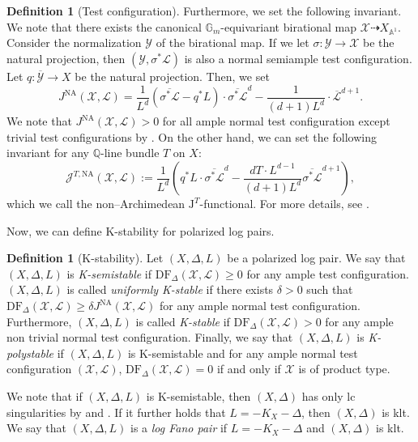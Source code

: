 \documentclass[12pt,twoside]{amsart}
\theoremstyle{definition}
\newtheorem{defn}[thm]{Definition}
\begin{document}
\begin{defn}[Test configuration]
    Furthermore, we set the following invariant.
    We note that there exists the canonical $\mathbb{G}_m$-equivariant birational map $\mathcal{X}\dashrightarrow X_{\mathbb{A}^1}$.
    Consider the normalization $\mathcal{Y}$ of the birational map.
    If we let $\sigma\colon \mathcal{Y}\to\mathcal{X}$ be the natural projection, then $(\mathcal{Y},\sigma^*\mathcal{L})$ is also a normal semiample test configuration.
    Let $q\colon \overline{\mathcal{Y}}\to X$ be the natural projection.
    Then, we set
    \[
    J^{\mathrm{NA}}(\mathcal{X},\mathcal{L})=\frac{1}{L^d}(\overline{\sigma^*\mathcal{L}}-q^*L)\cdot \overline{\sigma^*\mathcal{L}}^d-\frac{1}{(d+1)L^{d}}\cdot \overline{\mathcal{L}}^{d+1}.
    \]
    We note that $J^{\mathrm{NA}}(\mathcal{X},\mathcal{L})>0$ for all ample normal test configuration except trivial test configurations by \cite[Proposition 7.8]{BHJ}.
    On the other hand, we can set the following invariant for any $\mathbb{Q}$-line bundle $T$ on $X$:
    \begin{equation*}
        \mathcal{J}^{T,\mathrm{NA}}(\mathcal{X},\mathcal{L}):=\frac{1}{L^d}\left(q^*L\cdot\overline{\sigma^*\mathcal{L}}^d-\frac{dT\cdot L^{d-1}}{(d+1)L^d}\overline{\sigma^*\mathcal{L}}^{d+1} \right),
    \end{equation*}
    which we call the non--Archimedean $\mathrm{J}^T$-functional.
    For more details, see \cite{BHJ}.
\end{defn}
Now, we can define K-stability for polarized log pairs.
\begin{defn}[K-stability]
    Let $(X,\Delta,L)$ be a polarized log pair.
    We say that $(X,\Delta,L)$ is {\it K-semistable} if $\mathrm{DF}_{\Delta}(\mathcal{X},\mathcal{L})\ge0$ for any ample test configuration.
    $(X,\Delta,L)$ is called {\it uniformly K-stable} if there exists $\delta>0$ such that $\mathrm{DF}_{\Delta}(\mathcal{X},\mathcal{L})\ge\delta J^{\mathrm{NA}}(\mathcal{X},\mathcal{L})$ for any ample normal test configuration.
    Furthermore, $(X,\Delta,L)$ is called {\it K-stable} if $\mathrm{DF}_{\Delta}(\mathcal{X},\mathcal{L})>0$ for any ample non trivial normal test configuration.
    Finally, we say that $(X,\Delta,L)$ is {\it K-polystable} if $(X,\Delta,L)$ is K-semistable and for any ample normal test configuration $(\mathcal{X},\mathcal{L})$, $\mathrm{DF}_{\Delta}(\mathcal{X},\mathcal{L})=0$ if and only if $\mathcal{X}$ is of product type.
\end{defn}

We note that if $(X,\Delta,L)$ is K-semistable, then $(X,\Delta)$ has only lc singularities by \cite{GIToda} and \cite[Theorem 6.1]{OS}.
If it further holds that $L=-K_X-\Delta$, then $(X,\Delta)$ is klt.
We say that $(X,\Delta,L)$ is a {\it log Fano pair} if $L=-K_X-\Delta$ and $(X,\Delta)$ is klt.
\end{document}
